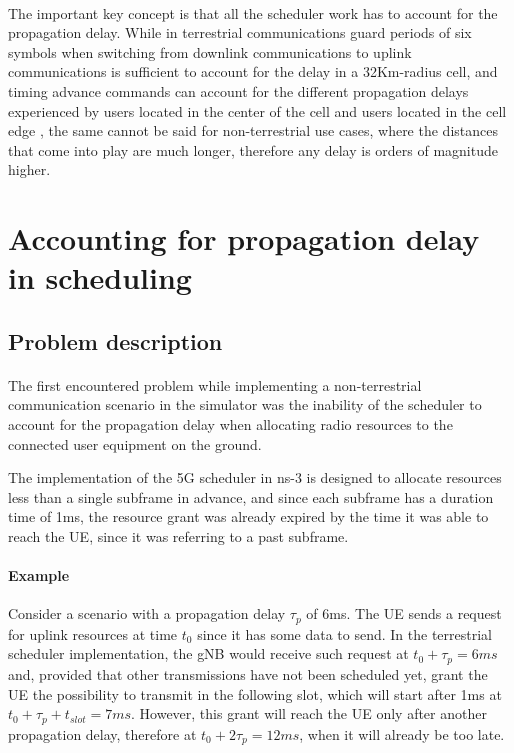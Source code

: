 \paragraph{}The important key concept is that all the scheduler work has to account for the propagation delay. While in terrestrial communications guard periods of six symbols when switching from downlink communications to uplink communications is sufficient to account for the delay in a 32Km-radius cell, and timing advance commands can account for the different propagation delays experienced by users located in the center of the cell and users located in the cell edge \cite{gsma-5g-tdd-sync}, the same cannot be said for non-terrestrial use cases, where the distances that come into play are much longer, therefore any delay is orders of magnitude higher.

\section{Accounting for propagation delay in scheduling}
\label{sec:pd-sched-acc}

\subsection{Problem description}
\label{ss:propdelay-problem-desc}
\paragraph{}
The first encountered problem while implementing a non-terrestrial communication scenario in the simulator was the inability of the scheduler to account for the propagation delay when allocating radio resources to the connected user equipment on the ground.

The implementation of the 5G scheduler in ns-3 is designed to allocate resources less than a single subframe in advance, and since each subframe has a duration time of 1ms, the resource grant was already expired by the time it was able to reach the \ac{UE}, since it was referring to a past subframe.

\paragraph{Example} Consider a scenario with a propagation delay $\tau_p$ of 6ms. The \ac{UE} sends a request for uplink resources at time $t_0$ since it has some data to send. In the terrestrial scheduler implementation, the \ac{gNB} would receive such request at $t_0+\tau_p=6\textit{ms}$ and, provided that other transmissions have not been scheduled yet, grant the \ac{UE} the possibility to transmit in the following slot, which will start after 1ms at $t_0+\tau_p+t_{\textit{slot}}=7\textit{ms}$. However, this grant will reach the \ac{UE} only after another propagation delay, therefore at $t_0+2\tau_p=12\textit{ms}$, when it will already be too late.

